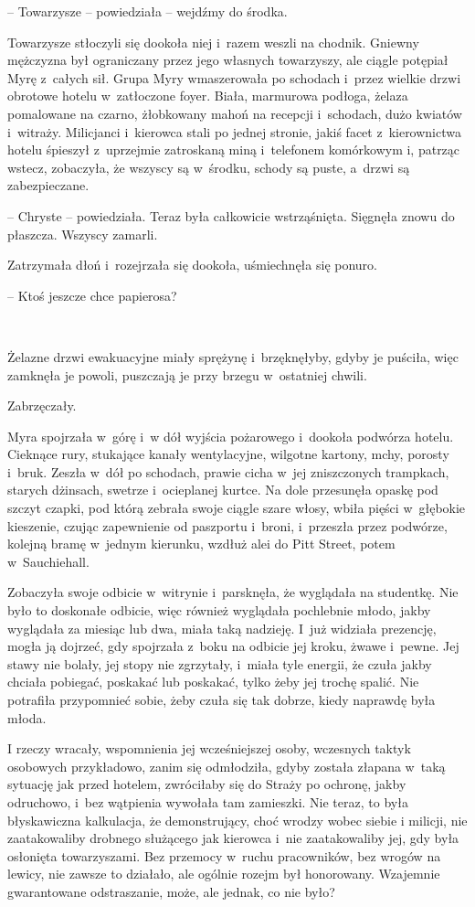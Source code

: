 \documentclass[oneside,polish,11pt,sfheadings]{mwbk}
\begin{document}
-- Towarzysze -- powiedziała -- wejdźmy do środka.

Towarzysze stłoczyli się dookoła niej i~razem weszli na chodnik. Gniewny
mężczyzna był ograniczany przez jego własnych towarzyszy, ale ciągle
potępiał Myrę z~całych sił. Grupa Myry wmaszerowała po schodach i~przez
wielkie drzwi obrotowe hotelu w~zatłoczone foyer. Biała, marmurowa
podłoga, żelaza pomalowane na czarno, żłobkowany mahoń na recepcji i~schodach, dużo kwiatów i~witraży. Milicjanci i~kierowca stali po jednej
stronie, jakiś facet z~kierownictwa hotelu śpieszył z~uprzejmie
zatroskaną miną i~telefonem komórkowym i, patrząc wstecz, zobaczyła, że
wszyscy są w~środku, schody są puste, a~drzwi są zabezpieczane.

-- Chryste -- powiedziała. Teraz była całkowicie wstrząśnięta. Sięgnęła
znowu do płaszcza. Wszyscy zamarli.

Zatrzymała dłoń i~rozejrzała się dookoła, uśmiechnęła się ponuro.

-- Ktoś jeszcze chce papierosa?

~

Żelazne drzwi ewakuacyjne miały sprężynę i~brzęknęłyby, gdyby je
puściła, więc zamknęła je powoli, puszczają je przy brzegu w~ostatniej
chwili.

Zabrzęczały.

Myra spojrzała w~górę i~w dół wyjścia pożarowego i~dookoła podwórza
hotelu. Cieknące rury, stukające kanały wentylacyjne, wilgotne kartony,
mchy, porosty i~bruk. Zeszła w~dół po schodach, prawie cicha w~jej
zniszczonych trampkach, starych dżinsach, swetrze i~ocieplanej kurtce.
Na dole przesunęła opaskę pod szczyt czapki, pod którą zebrała swoje
ciągle szare włosy, wbiła pięści w~głębokie kieszenie, czując
zapewnienie od paszportu i~broni, i~przeszła przez podwórze, kolejną
bramę w~jednym kierunku, wzdłuż alei do Pitt Street, potem w~Sauchiehall.

Zobaczyła swoje odbicie w~witrynie i~parsknęła, że wyglądała na
studentkę. Nie było to doskonałe odbicie, więc również wyglądała
pochlebnie młodo, jakby wyglądała za miesiąc lub dwa, miała taką
nadzieję. I~już widziała prezencję, mogła ją dojrzeć, gdy spojrzała z~boku na odbicie jej kroku, żwawe i~pewne. Jej stawy nie bolały, jej
stopy nie zgrzytały, i~miała tyle energii, że czuła jakby chciała
pobiegać, poskakać lub poskakać, tylko żeby jej trochę spalić. Nie
potrafiła przypomnieć sobie, żeby czuła się tak dobrze, kiedy naprawdę
była młoda.

I rzeczy wracały, wspomnienia jej wcześniejszej osoby, wczesnych taktyk
osobowych przykładowo, zanim się odmłodziła, gdyby została złapana w~taką sytuację jak przed hotelem, zwróciłaby się do Straży po ochronę,
jakby odruchowo, i~bez wątpienia wywołała tam zamieszki. Nie teraz, to
była błyskawiczna kalkulacja, że demonstrujący, choć wrodzy wobec siebie
i milicji, nie zaatakowaliby drobnego służącego jak kierowca i~nie
zaatakowaliby jej, gdy była osłonięta towarzyszami. Bez przemocy w~ruchu
pracowników, bez wrogów na lewicy, nie zawsze to działało, ale ogólnie
rozejm był honorowany. Wzajemnie gwarantowane odstraszanie, może, ale
jednak, co nie było?
\end{document}
